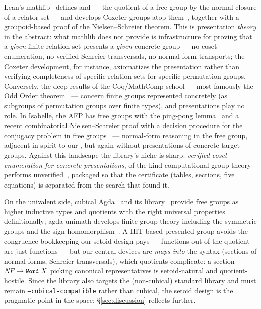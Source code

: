 Lean's mathlib~\cite{mathlib2020} defines  and
 --- the quotient of a free group by the normal
closure of a relator set --- and develops Coxeter groups atop
them~\cite{mathlib-doc-presented}, together with a groupoid-based proof
of the Nielsen--Schreier theorem.  This is presentation \emph{theory} in
the abstract: what mathlib does not provide is infrastructure for
proving that a \emph{given} finite relation set presents a \emph{given}
concrete group --- no coset enumeration, no verified Schreier
transversals, no normal-form transports; the Coxeter development, for
instance, axiomatizes the presentation rather than verifying completeness
of specific relation sets for specific permutation groups.  Conversely,
the deep results of the Coq/MathComp school --- most famously the Odd
Order theorem~\cite{gonthier2013oddorder} --- concern finite groups
represented concretely (as subgroups of permutation groups over finite
types), and presentations play no role.  In Isabelle, the AFP has free
groups with the ping-pong lemma~\cite{breitner2010freegroups} and a
recent combinatorial Nielsen--Schreier proof with a decision procedure
for the conjugacy problem in free groups~\cite{kharim2023freegroups} ---
normal-form reasoning in the free group, adjacent in spirit to our
, but again without presentations of concrete
target groups.  Against this landscape the library's niche is sharp:
\emph{verified coset enumeration for concrete presentations}, of the kind
computational group theory performs unverified~\cite{sims1994computation,
holt2005handbook}, packaged so that the certificate (tables, sections,
five equations) is separated from the search that found it.

On the univalent side, cubical Agda~\cite{vezzosi2019cubical} and its
library~\cite{cubicallibrary} provide free groups as higher inductive
types and quotients with the right universal properties definitionally;
agda-unimath develops finite group theory including the symmetric groups
and the sign homomorphism~\cite{agdaunimath,mangel2023sign}.  A HIT-based
presented group avoids the congruence bookkeeping our setoid design pays
--- functions out of the quotient are just functions --- but our central
devices are \emph{maps into} the syntax (sections of normal forms,
Schreier transversals), which quotients complicate: a section
$\mathit{NF} \to \mbox{\texttt{\small Word}}\;X$ picking canonical representatives is
setoid-natural and quotient-hostile.  Since the library also targets the
(non-cubical) standard library and must remain
\texttt{--cubical-compatible} rather than cubical, the setoid design
is the pragmatic point in the space; \S\ref{sec:discussion} reflects
further.

